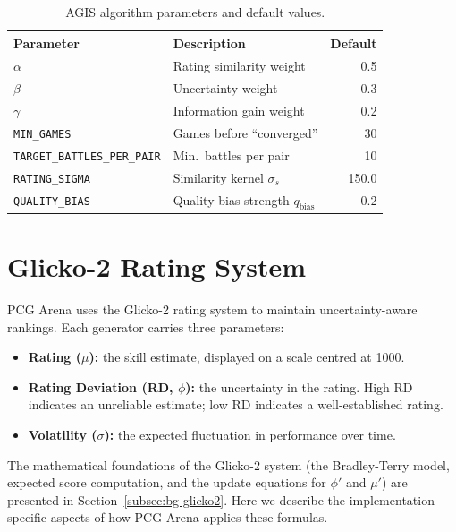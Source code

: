 \documentclass[shortabstract, mgr, english]{iithesis}
\begin{document}
\begin{table}[H]
\centering
\begin{tabular}{llr}
\toprule
\textbf{Parameter} & \textbf{Description} & \textbf{Default} \\
\midrule
$\alpha$ & Rating similarity weight & 0.5 \\
$\beta$  & Uncertainty weight       & 0.3 \\
$\gamma$ & Information gain weight  & 0.2 \\
\texttt{MIN\_GAMES}            & Games before ``converged''  & 30 \\
\texttt{TARGET\_BATTLES\_PER\_PAIR} & Min.\ battles per pair & 10 \\
\texttt{RATING\_SIGMA}        & Similarity kernel $\sigma_s$ & 150.0 \\
\texttt{QUALITY\_BIAS}        & Quality bias strength $q_{\text{bias}}$ & 0.2 \\
\bottomrule
\end{tabular}
\caption{AGIS algorithm parameters and default values.}
\label{tab:agis-params}
\end{table}

\section{Glicko-2 Rating System}
\label{sec:sd-rating}

PCG Arena uses the Glicko-2 rating system \cite{glickman2012glicko2} to maintain
uncertainty-aware rankings. Each generator carries three parameters:

\begin{itemize}
    \item \textbf{Rating ($\mu$):} the skill estimate, displayed on a scale centred at 1000.
    \item \textbf{Rating Deviation (RD, $\phi$):} the uncertainty in the rating. High RD
          indicates an unreliable estimate; low RD indicates a well-established rating.
    \item \textbf{Volatility ($\sigma$):} the expected fluctuation in performance over time.
\end{itemize}

The mathematical foundations of the Glicko-2 system (the Bradley-Terry
model, expected score computation, and the update equations for $\phi'$ and
$\mu'$) are presented in Section~\ref{subsec:bg-glicko2}. Here we describe the
implementation-specific aspects of how PCG Arena applies these formulas.
\end{document}
